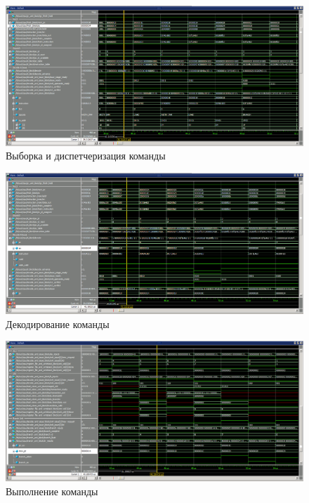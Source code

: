 \begin{figure}[H]
	\begin{center}
		\includegraphics[scale=0.3]{img/cmd_fetch_dispetch.png}
	\end{center}
	\captionsetup{justification=centering}
	\caption{Выборка и диспетчеризация команды}
	\label{img:cmd1}
\end{figure}

\begin{figure}[H]
	\begin{center}
		\includegraphics[scale=0.3]{img/cmd_decode.png}
	\end{center}
	\captionsetup{justification=centering}
	\caption{Декодирование команды}
	\label{img:cmd2}
\end{figure}

\begin{figure}[H]
	\begin{center}
		\includegraphics[scale=0.3]{img/cmd_vipoln.png}
	\end{center}
	\captionsetup{justification=centering}
	\caption{Выполнение команды}
	\label{img:cmd3}
\end{figure}


